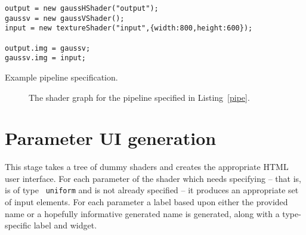 \documentclass[12pt,twoside,notitlepage]{report}
\begin{document}
\begin{listing}[H]
\begin{verbatim}
output = new gaussHShader("output");
gaussv = new gaussVShader();
input = new textureShader("input",{width:800,height:600});

output.img = gaussv;
gaussv.img = input;
\end{verbatim}
\caption{Example pipeline specification.\label{pipe}}
\end{listing}

\begin{figure}

\caption{The shader graph for the pipeline specified in Listing~\ref{pipe}.\label{pipe-graph}}
\end{figure}

\clearpage
\section{Parameter UI generation}
\label{ui-params}
This stage takes a tree of dummy shaders and creates the appropriate HTML user interface. For each parameter of the shader which needs specifying -- that is, is of type \texttt{ uniform} and is not already specified -- it produces an appropriate set of input elements. For each parameter a label based upon either the provided name or a hopefully informative generated name is generated, along with a type-specific label and widget.
\end{document}
